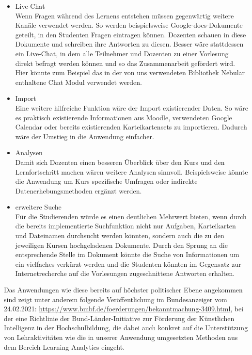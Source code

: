 \begin{itemize}
    \item Live-Chat\\
        Wenn Fragen während des Lernens entstehen müssen gegenwärtig weitere Kanäle verwendet werden.
        So werden beispielsweise Google-docs-Dokumente geteilt, in den Studenten Fragen eintragen können.
        Dozenten schauen in diese Dokumente und schreiben ihre Antworten zu diesen.
        Besser wäre stattdessen ein Live-Chat, in dem alle Teilnehmer und Dozenten zu einer Vorlesung direkt befragt werden können und so das Zusammenarbeit gefördert wird. Hier könnte zum Beispiel das in der von uns  verwendeten Bibliothek Nebular enthaltene Chat Modul verwendet werden.
    \item Import\\
        Eine weitere hilfreiche Funktion wäre der Import existierender Daten.
        So wäre es praktisch existierende Informationen aus Moodle, verwendeten Google Calendar oder bereits existierenden Karteikartensets zu importieren. Dadurch wäre der Umstieg in die Anwendung einfacher. 
    \item Analysen\\
        Damit sich Dozenten einen besseren Überblick über den Kurs und den Lernfortschritt machen wären weitere Analysen sinnvoll. Beispielsweise könnte die Anwendung um Kurs spezifische Umfragen oder indirekte Datenerhebungsmethoden ergänzt werden.
    \item erweitere Suche\\
		Für die Studierenden würde es einen deutlichen Mehrwert bieten, wenn durch die bereits implementierte Suchfunktion nicht nur Aufgaben, Karteikarten und Dateinamen durchsucht werden könnten, sondern auch die zu den jeweiligen Kursen hochgeladenen Dokumente. Durch den Sprung an die entsprechende Stelle im Dokument könnte die Suche von Informationen um ein vielfaches verkürzt werden und die Studenten könnten im Gegensatz zur Internetrecherche auf die Vorlesungen zugeschnittene Antworten erhalten.
\end{itemize}

Das Anwendungen wie diese bereits auf höchster politischer Ebene angekommen sind zeigt unter anderem folgende Veröffentlichung im Bundesanzeiger vom 24.02.2021: \url{https://www.bmbf.de/foerderungen/bekanntmachung-3409.html}, bei der eine Richtlinie der Bund-Länder-Initiative zur Förderung der Künstlichen Intelligenz in der Hochschulbildung, die dabei auch konkret auf die Unterstützung von Lehraktivitäten wie die in unserer Anwendung umgesetzten Methoden aus dem Bereich Learning Analytics eingeht.